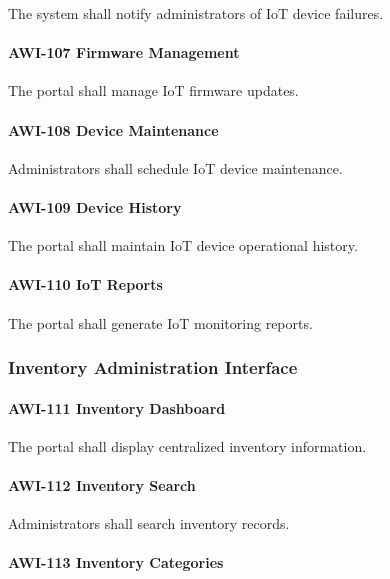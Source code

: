 The system shall notify administrators of IoT device failures.

\paragraph{AWI-107 Firmware Management}

The portal shall manage IoT firmware updates.

\paragraph{AWI-108 Device Maintenance}

Administrators shall schedule IoT device maintenance.

\paragraph{AWI-109 Device History}

The portal shall maintain IoT device operational history.

\paragraph{AWI-110 IoT Reports}

The portal shall generate IoT monitoring reports.


\subsubsection*{Inventory Administration Interface}

\paragraph{AWI-111 Inventory Dashboard}

The portal shall display centralized inventory information.

\paragraph{AWI-112 Inventory Search}

Administrators shall search inventory records.

\paragraph{AWI-113 Inventory Categories}

